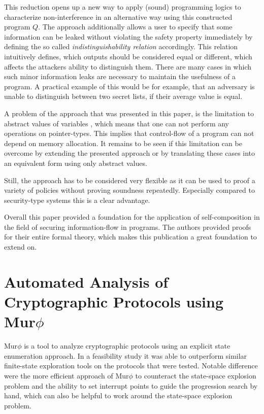 \documentclass[a4paper,UKenglish]{lipics-v2018}
\def\murphi{Mur$\phi$ }
\begin{document}
This reduction opens up a new way to apply (sound) programming logics to characterize non-interference in an alternative way using this constructed program $Q$. The approach additionally allows a user to specify that some information can be leaked without violating the safety property immediately by defining the so called \textit{indistinguishability relation} accordingly. This relation intuitively defines, which outputs should be considered equal or different, which affects the attackers ability to distinguish them. There are many cases in which such minor information leaks are necessary to maintain the usefulness of a program. A practical example of this would be for example, that an adversary is unable to distinguish between two secret lists, if their average value is equal.
\cite{information_flow_by_self_composition}

A problem of the approach that was presented in this paper, is the limitation to abstract values of variables
\cite{information_flow_by_self_composition}, which means that one can not perform any operations on pointer-types. This implies that control-flow of a program can not depend on memory allocation. It remains to be seen if this limitation can be overcome by extending the presented approach or by translating these cases into an equivalent form using only abstract values.

Still, the approach has to be considered very flexible as it can be used to proof a variety of policies without proving soundness repeatedly. Especially compared to security-type systems this is a clear advantage.

Overall this paper provided a foundation for the application of self-composition in the field of securing information-flow in programs. The authors provided proofs for their entire formal theory, which makes this publication a great foundation to extend on.




\section{Automated Analysis of Cryptographic Protocols using \murphi}

\murphi is a tool to analyze cryptographic protocols using an explicit state enumeration approach. In a feasibility study it was able to outperform similar finite-state exploration tools on the protocols that were tested. Notable difference were the more efficient approach of \murphi to counteract the state-space explosion problem and the ability to set interrupt points to guide the progression search by hand, which can also be helpful to work around the state-space explosion problem.\cite{murphi}
\end{document}
